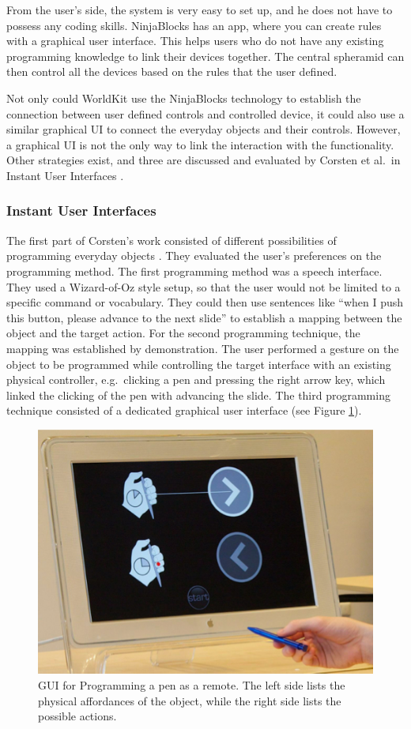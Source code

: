 From the user's side, the system is very easy to set up, and he does not have to possess any coding skills.
NinjaBlocks has an app, where you can create rules with a graphical user interface.
This helps users who do not have any existing programming knowledge to link their devices together.
The central spheramid can then control all the devices based on the rules that the user defined.

Not only could WorldKit use the NinjaBlocks technology to establish the connection between user defined controls and controlled device, it could also use a similar graphical UI to connect the everyday objects and their controls.
However, a graphical UI is not the only way to link the interaction with the functionality.
Other strategies exist, and three are discussed and evaluated by Corsten et al.\ in Instant User Interfaces \cite{corsten13}. 

\subsubsection{Instant User Interfaces}
\label{sec:worldKit}

The first part of Corsten's work consisted of different possibilities of programming everyday objects \cite{corsten13}.
They evaluated the user's preferences on the programming method.
The first programming method was a speech interface.
They used a Wizard-of-Oz style setup, so that the user would not be limited to a specific command or vocabulary.
They could then use sentences like ``when I push this button, please advance to the next slide'' to establish a mapping between the object and the target action.
For the second programming technique, the mapping was established by demonstration.
The user performed a gesture on the object to be programmed while controlling the target interface with an existing physical controller, e.g.\ clicking a pen and pressing the right arrow key, which linked the clicking of the pen with advancing the slide.
The third programming technique consisted of a dedicated graphical user interface (see Figure \ref{fig:iuigui}).
\begin{figure}[!t]
	\centering
	\includegraphics[width=0.9\columnwidth]{Images/IUIGui}
	\caption{GUI for Programming a pen as a remote. The left side lists the physical affordances of the object, while the right side lists the possible actions.}
	\label{fig:iuigui}
\end{figure}

